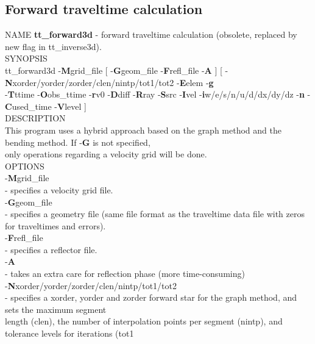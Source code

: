 \documentclass[twoside,final,onecolumn]{article}
\newcommand{\forceindent}{\leavevmode{\parindent=1em\indent}}
\begin{document}
\subsection{Forward traveltime calculation}

NAME \textbf{tt\_forward3d} - forward traveltime calculation (obsolete, replaced by new flag in tt\_inverse3d).\\[6pt]
SYNOPSIS\\
\forceindent tt\_forward3d -\textbf{M}grid\_file [ -\textbf{G}geom\_file -\textbf{F}refl\_file -\textbf{A} ] [ -\textbf{N}xorder/yorder/zorder/clen/nintp/tot1/tot2 
-\textbf{E}elem -\textbf{g} \\
\forceindent-\textbf{T}ttime -\textbf{O}obs\_ttime -\textbf{r}v0 -\textbf{D}diff -\textbf{R}ray -\textbf{S}src -\textbf{I}vel 
-\textbf{i}w/e/s/n/u/d/dx/dy/dz -\textbf{n} -\textbf{C}used\_time -\textbf{V}level ]\\[6pt]
DESCRIPTION \\
\forceindent This program uses a hybrid approach based on the graph method and the bending method.
If -\textbf{G} is not specified, \\
\forceindent only operations regarding a velocity grid will be done.\\[6pt]
OPTIONS \\
\forceindent -\textbf{M}grid\_file \\
\forceindent\forceindent - specifies a velocity grid file.\\[6pt]
\forceindent -\textbf{G}geom\_file \\
\forceindent\forceindent - specifies a geometry file (same file format as the traveltime data file with zeros for traveltimes and errors).\\[6pt]
\forceindent -\textbf{F}refl\_file \\
\forceindent\forceindent - specifies a reflector file.\\[6pt]
\forceindent -\textbf{A} \\
\forceindent\forceindent - takes an extra care for reflection phase (more time-consuming) \\[6pt]
\forceindent -\textbf{N}xorder/yorder/zorder/clen/nintp/tot1/tot2 \\
\forceindent\forceindent - specifies a xorder, yorder and zorder forward star for the graph method, and sets the maximum segment \\
\forceindent\forceindent length (clen), the number of interpolation points per segment (nintp), and tolerance levels for iterations (tot1 \\
\end{document}
